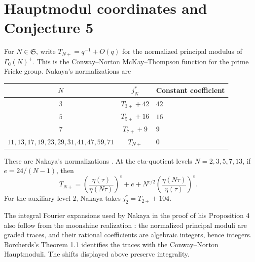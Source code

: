 \documentclass[11pt,a4paper]{article}
\theoremstyle{remark}\newtheorem{remark}[theorem]{Remark}
\numberwithin{equation}{section}
\begin{document}
	\section{Hauptmodul coordinates and Conjecture 5}\label{sec:haupt}
	For $N\in\mathfrak S$, write $T_{N+}=q^{-1}+O(q)$ for the normalized principal modulus of $\Gamma_0(N)^+$. This is the Conway--Norton McKay--Thompson function for the prime Fricke group. Nakaya's normalizations are
	\begin{center}
		\begin{tabular}{ccl}\toprule
			$N$ & $j_N^*$ & Constant coefficient\\\midrule
			$3$ & $T_{3+}+42$ & $42$\\
			$5$ & $T_{5+}+16$ & $16$\\
			$7$ & $T_{7+}+9$ & $9$\\
			$11,13,17,19,23,29,31,41,47,59,71$ & $T_{N+}$ & $0$\\\bottomrule
		\end{tabular}
	\end{center}
	These are Nakaya's normalizations \cite[Section 4.1]{Nakaya}. At the eta-quotient levels $N=2,3,5,7,13$, if $e=24/(N-1)$, then
	\begin{equation}\label{eq:eta}
		T_{N+}=\left(\frac{\eta(\tau)}{\eta(N\tau)}\right)^e
		+e+N^{e/2}\left(\frac{\eta(N\tau)}{\eta(\tau)}\right)^e.
	\end{equation}
	For the auxiliary level $2$, Nakaya takes $j_2^*=T_{2+}+104$.
	
	The integral Fourier expansions used by Nakaya in the proof of his Proposition 4 also follow from the moonshine realization \cite{CN,Borcherds}: the normalized principal moduli are graded traces, and their rational coefficients are algebraic integers, hence integers. Borcherds's Theorem 1.1 identifies the traces with the Conway--Norton Hauptmoduli. The shifts displayed above preserve integrality.
	
\end{document}
